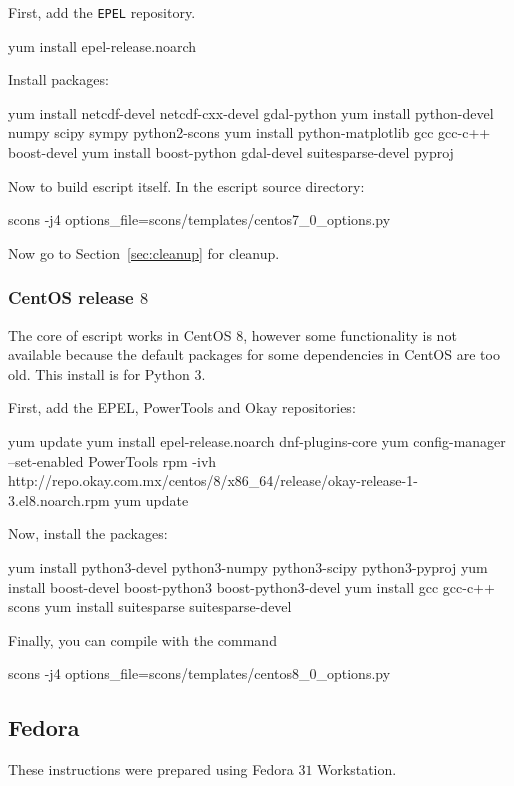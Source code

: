 \noindent First, add the \texttt{EPEL} repository.
\begin{shellCode}
yum install epel-release.noarch
\end{shellCode}

\noindent Install packages:
\begin{shellCode}
yum install netcdf-devel netcdf-cxx-devel gdal-python
yum install python-devel numpy scipy sympy python2-scons
yum install python-matplotlib gcc gcc-c++ boost-devel
yum install boost-python gdal-devel suitesparse-devel pyproj
\end{shellCode}

\noindent Now to build escript itself.
In the escript source directory:
\begin{shellCode}
scons -j4 options_file=scons/templates/centos7_0_options.py
\end{shellCode}

\noindent Now go to Section~\ref{sec:cleanup} for cleanup.

\subsubsection{CentOS release $8$}
The core of escript works in CentOS $8$, however some functionality is not available because the default packages for some dependencies in CentOS are too old. This install is for Python 3.

First, add the EPEL, PowerTools and Okay repositories:
\begin{shellCode}
yum update
yum install epel-release.noarch dnf-plugins-core
yum config-manager --set-enabled PowerTools
rpm -ivh http://repo.okay.com.mx/centos/8/x86_64/release/okay-release-1-3.el8.noarch.rpm
yum update
\end{shellCode}

Now, install the packages:
\begin{shellCode}
yum install python3-devel python3-numpy python3-scipy python3-pyproj
yum install boost-devel boost-python3 boost-python3-devel
yum install gcc gcc-c++ scons
yum install suitesparse suitesparse-devel 
\end{shellCode}

Finally, you can compile \escript with the command
\begin{shellCode}
scons -j4 options_file=scons/templates/centos8_0_options.py
\end{shellCode}

\subsection{Fedora}\label{sec:fedorasrc}
These instructions were prepared using Fedora $31$ Workstation.

